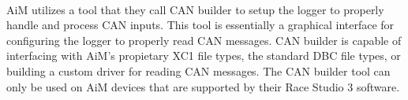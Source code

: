 \paragraph{}
AiM utilizes a tool that they call CAN builder to setup the logger to properly handle and process CAN inputs.
This tool is essentially a graphical interface for configuring the logger to properly read CAN messages.
CAN builder is capable of interfacing with AiM's propietary XC1 file types, the standard DBC file types, or building a custom driver for reading CAN messages.
The CAN builder tool can only be used on AiM devices that are supported by their Race Studio 3 software.